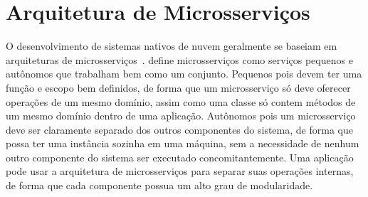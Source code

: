 \section{Arquitetura de Microsserviços}
\label{sec:microservicearquitecture}

O desenvolvimento de sistemas nativos de nuvem geralmente se baseiam em arquiteturas de microsserviços~\citep{garrison2017cloud}. %
 \cite{Newman:2015:BM:2904388} define microsserviços como serviços pequenos e autônomos que trabalham bem como um conjunto. Pequenos pois devem ter uma função e escopo bem definidos, de forma que um microsserviço só deve oferecer operações de um mesmo domínio, assim como uma classe só contem métodos de um mesmo domínio dentro de uma aplicação. Autônomos pois um microsserviço deve ser claramente separado dos outros componentes do sistema, de forma que possa ter uma instância sozinha em uma máquina, sem a necessidade de nenhum outro componente do sistema ser executado concomitantemente. Uma aplicação pode usar a arquitetura de microsserviços para separar suas operações internas, de forma que cada componente possua um alto grau de modularidade. 

